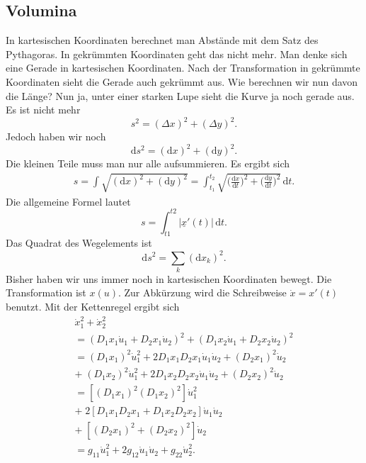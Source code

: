 \documentclass[a4paper,10pt,fleqn,twocolumn,twoside]{article}
\numberwithin{equation}{section}
\begin{document}
\subsection{Volumina}

In kartesischen Koordinaten berechnet man Abstände mit dem Satz des
Pythagoras. In gekrümmten Koordinaten geht das nicht mehr. Man denke
sich eine Gerade in kartesischen Koordinaten. Nach der Transformation
in gekrümmte Koordinaten sieht die Gerade auch gekrümmt aus. Wie
berechnen wir nun davon die Länge? Nun ja, unter einer starken Lupe
sieht die Kurve ja noch gerade aus. Es ist nicht mehr
\begin{equation}
s^2 = (\Delta x)^2+(\Delta y)^2.
\end{equation}
Jedoch haben wir noch
\begin{equation}
\mathrm ds^2 = (\mathrm dx)^2+(\mathrm dy)^2.
\end{equation}
Die kleinen Teile muss man nur alle aufsummieren. Es ergibt sich
\begin{gather*}
s = \int \sqrt{(\mathrm dx)^2+(\mathrm dy)^2}
= \int_{t_1}^{t_2}\sqrt{\Big(\frac{\mathrm dx}{\mathrm dt}\Big)^2
+\Big(\frac{\mathrm dy}{\mathrm dt}\Big)^2}\,\mathrm dt.
\end{gather*}
Die allgemeine Formel lautet
\begin{equation}
s = \int_{t1}^{t2} |\underline x'(t)|\,\mathrm dt.
\end{equation}
Das Quadrat des Wegelements ist
\begin{equation}
\mathrm ds^2 = \sum_k (\mathrm dx_k)^2.
\end{equation}
Bisher haben wir uns immer noch in kartesischen Koordinaten bewegt.
Die Transformation ist $x(u)$. Zur Abkürzung wird die Schreibweise
$\dot x=x'(t)$ benutzt. Mit der Kettenregel ergibt sich
\begin{gather*}
\dot x_1^2+\dot x_2^2\\
= (D_1x_1\dot u_1+D_2x_1\dot u_2)^2
+ (D_1x_2\dot u_1+D_2x_2\dot u_2)^2\\
= (D_1x_1)^2\dot u_1^2+2D_1x_1D_2x_1\dot u_1\dot u_2
+ (D_2x_1)^2\dot u_2\\
+\; (D_1x_2)^2\dot u_1^2+2D_1x_2D_2x_2\dot u_1\dot u_2
+ (D_2x_2)^2\dot u_2\\
= [(D_1x_1)^2(D_1x_2)^2]\dot u_1^2\\
+\; 2[D_1x_1D_2x_1+D_1x_2D_2x_2]\dot u_1\dot u_2\\
+\; [(D_2x_1)^2+(D_2x_2)^2]\dot u_2\\
= g_{11}\dot u_1^2+2g_{12}\dot u_1\dot u_2+g_{22}\dot u_2^2.
\end{gather*}
\end{document}
